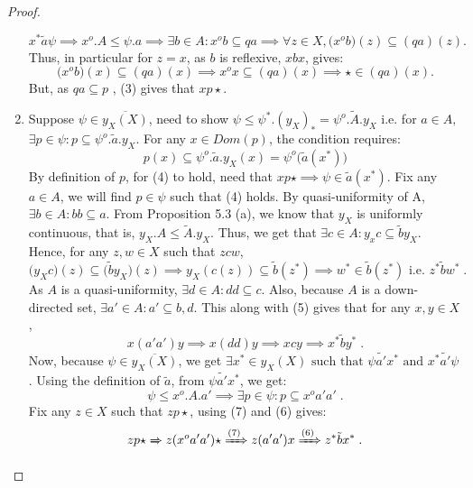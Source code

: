 \documentclass[a4paper]{article}
\theoremstyle{definition}
\begin{document}
\begin{proof}
\begin{enumerate}[label=(\alph*)]
				\begin{equation} x^* \tilde{a} \psi \implies x^o.A \leq \psi.a
					\implies \exists b\in A: x^ob \subseteq qa
					\implies \forall z \in X, \big(x^o b \big)(z) \subseteq (qa)(z)
				.\end{equation}
				Thus, in particular for $z=x$, as $b$ is reflexive, $xbx$, gives:
				\begin{equation} \big(x^o b \big)(x) \subseteq (qa)(x) \implies x^ox \subseteq (qa)(x) \implies \star \in (qa)(x). \end{equation}
				But, as $qa \subseteq p$ , (3) gives that $xp\star$.
			\item Suppose $\psi \in \overline{y_X(X)}$, need to show $\psi \leq \psi^*.(y_X)_*=\psi^o.\tilde{A}.y_X$ i.e.
				for $a \in A,$ $\exists p \in \psi: p \subseteq \psi^o.\tilde{a}.y_X$. For any $x \in Dom(p)$,
				the condition requires:
				\begin{equation}
					p(x) \subseteq  \psi^o.\tilde{a} .y_X(x)=\psi^o\big(\tilde{a} (x^*)\big)
				\end{equation}
				By definition of $p$, for (4) to hold, need that $xp\star \implies \psi \in \tilde{a}(x^*) $. Fix
				any $a\in A$, we will find $p \in \psi$ such that (4) holds.
				By quasi-uniformity of A,
				$\exists b \in A: bb \subseteq a$. From Proposition 5.3 (a),
				we know that $y_X$ is uniformly continuous, that is,
				$y_X.A \leq \tilde{A}.y_X $. Thus, we get that $\exists c \in A: y_xc \subseteq \tilde{b}y_X $. Hence, for any $z,w\in X$ such that $z c w$,
				\begin{equation} \big(y_X c \big)(z) \subseteq \big(\tilde{b} y_X\big)(z) \implies
					y_X(c(z)) \subseteq \tilde{b}(z^*) \implies w^* \in \tilde{b}(z^*) \text{ i.e. } z^* \tilde{b} w^*\;.
				\end{equation}
				As $A$ is a quasi-uniformity, $\exists d\in A: dd \subseteq c$. Also, because $A$ is a down-
				directed set, $\exists a' \in A: a' \subseteq b,d $. This along with (5) gives that
				for any $x,y \in X$,
				\begin{equation} x(a'a')y \implies x(dd)y \implies xcy \implies x^* \tilde{b} y^* \; .\end{equation}
				Now, because $\psi \in \overline{y_X(X)}$, we get
				$\exists x^* \in y_X(X) \text{ such that } \psi \tilde{a'}x^* \text{ and } x^* \tilde{a'} \psi $.
				Using the definition of $\tilde{a}$, from $\psi \tilde{a'}x^*$,
				we get:
				\begin{equation} \psi \leq x^o.A.a' \implies \exists p \in \psi: p \subseteq x^o a'a' \; .\end{equation}
				Fix any $z \in X$ such that $zp \star$, using (7) and (6) gives:
				\begin{equation} zp \star \xRightarrow{} z(x^o a'a') \star \xRightarrow{(7)} z(a'a')x
				\xRightarrow{(6)} z^* \tilde{b}x^*  \; . \end{equation}


\end{enumerate}
\end{proof}
\end{document}
